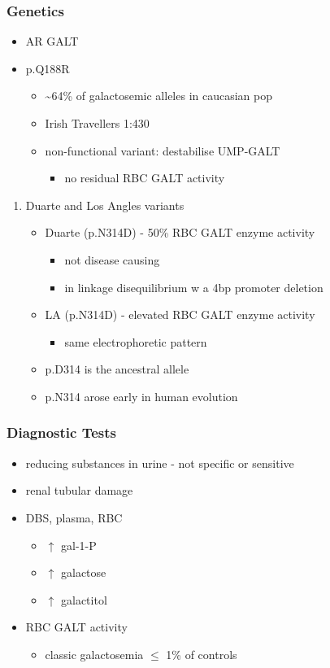 \documentclass[12pt]{scrartcl}
\begin{document}
\subsubsection{Genetics}
\label{sec:org29af0d1}
\begin{itemize}
\item AR GALT
\item p.Q188R
\begin{itemize}
\item \textasciitilde{}64\% of galactosemic alleles in caucasian pop
\item Irish Travellers 1:430
\item non-functional variant: destabilise UMP-GALT
\begin{itemize}
\item no residual RBC GALT activity
\end{itemize}
\end{itemize}
\end{itemize}
\begin{enumerate}
\item Duarte and Los Angles variants
\label{sec:org5264f2d}
\begin{itemize}
\item Duarte (p.N314D) - 50\% RBC GALT enzyme activity
\begin{itemize}
\item not disease causing
\item in linkage disequilibrium w a 4bp promoter deletion
\end{itemize}
\item LA (p.N314D) - elevated RBC GALT enzyme activity
\begin{itemize}
\item same electrophoretic pattern
\end{itemize}
\item p.D314 is the ancestral allele
\item p.N314 arose early in human evolution
\end{itemize}
\end{enumerate}

\subsubsection{Diagnostic Tests}
\label{sec:org66cb815}
\begin{itemize}
\item reducing substances in urine - not specific or sensitive
\item renal tubular damage
\item DBS, plasma, RBC
\begin{itemize}
\item \(\uparrow\) gal-1-P
\item \(\uparrow\) galactose
\item \(\uparrow\) galactitol
\end{itemize}
\item RBC GALT activity
\begin{itemize}
\item classic galactosemia \(\le\) 1\% of controls
\end{itemize}
\end{itemize}
\end{document}
